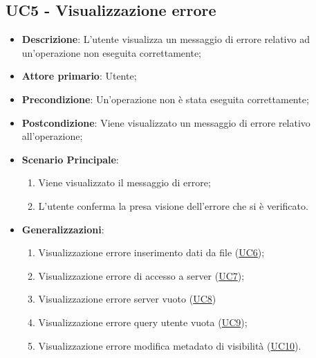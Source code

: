 \subsection{UC5 - Visualizzazione errore}
\label{sub:uc5}


\begin{itemize}
    \item \textbf{Descrizione}: L'utente visualizza un messaggio di errore relativo ad un'operazione non eseguita 
    correttamente;

    \item \textbf{Attore primario}: Utente;
    
    \item \textbf{Precondizione}:   Un'operazione non è stata eseguita correttamente; 

    \item \textbf{Postcondizione}:  Viene visualizzato un messaggio di errore relativo all'operazione;
    
    \item \textbf{Scenario Principale}:
    \begin{enumerate}
        \item Viene visualizzato il messaggio di errore;
        \item L'utente conferma la presa visione dell'errore che si è verificato.
    \end{enumerate}

    \item \textbf{Generalizzazioni}:
    \begin{enumerate}
        \item Visualizzazione errore inserimento dati da file (\hyperref[sub:uc6]{UC6});
        \item Visualizzazione errore di accesso a server (\hyperref[sub:uc7]{UC7});
        \item Visualizzazione errore server vuoto (\hyperref[sub:uc8]{UC8})
        \item Visualizzazione errore query utente vuota (\hyperref[sub:uc9]{UC9});
        \item Visualizzazione errore modifica metadato di visibilità (\hyperref[sub:uc10]{UC10}).
    \end{enumerate}

\end{itemize}

